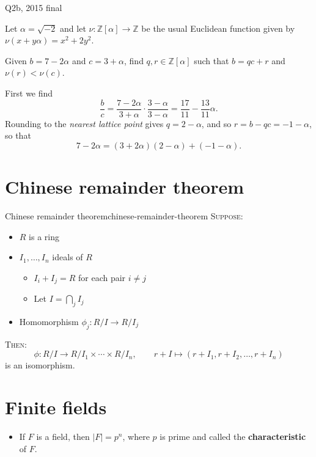 \begin{problem}{Q2b, 2015 final}{}


    Let $\alpha = \sqrt{-2}$ and let $\nu : \mathbb{Z}[\alpha] \to \mathbb{Z}$ be the usual Euclidean function given by $\nu(x + y \alpha) = x^2 + 2y^2$.

    Given $b = 7 - 2 \alpha$ and $c = 3 + \alpha$, find $q, r \in \mathbb{Z}[\alpha]$ such that $b = qc + r$ and $\nu(r) < \nu(c)$.

    \tcblower

    First we find
        $$ \frac{b}{c} = \frac{7 - 2\alpha}{3 + \alpha} \cdot \frac{3 - \alpha}{3 - \alpha}
            = \frac{17}{11} - \frac{13}{11} \alpha . $$
    Rounding to the \textit{nearest lattice point} gives $q = 2 - \alpha$, and so $r = b - qc = -1 - \alpha$, so that
        $$ 7 - 2 \alpha = (3 + 2 \alpha)(2 - \alpha) + (-1 - \alpha) . $$

\end{problem}

\section{Chinese remainder theorem}

\begin{theorem}{Chinese remainder theorem}{chinese-remainder-theorem}
    \textsc{Suppose}:
        \begin{itemize}
            \item $R$ is a ring
            \item $I_1, \ldots, I_n$ ideals of $R$
                \begin{itemize}
                    \item $I_i + I_j = R$ for each pair $i \neq j$
                    \item Let $I = \bigcap_j I_j$
                \end{itemize}
            \item Homomorphism $\phi_j : R/I \to R/I_j$
        \end{itemize}
    \textsc{Then}:
        $$ \phi : R/I \to R/I_1 \times \cdots \times R/I_n, \qquad
            r + I \mapsto (r + I_1, r + I_2, \ldots, r + I_n) $$
    is an isomorphism.
\end{theorem}

\section{Finite fields}

\begin{itemize}
    \item If $F$ is a field, then $\lvert F \rvert = p^n$, where $p$ is prime and called the \textbf{characteristic} of $F$.
\end{itemize}
